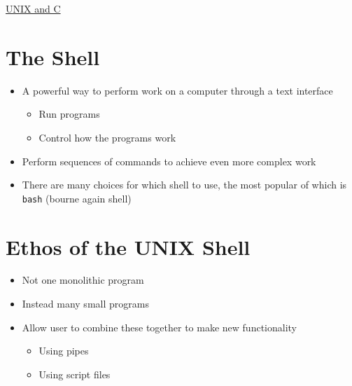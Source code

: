 \documentclass{article}
\begin{document}
	\begin{center}
		\underline{\huge UNIX and C}
	\end{center}

\section{The Shell}
\begin{itemize}
\item A powerful way to perform work on a computer through a text interface
\begin{itemize}
\item Run programs
\item Control how the programs work
\end{itemize}
\item Perform sequences of commands to achieve even more complex work
\item There are many choices for which shell to use, the most popular of which is \verb!bash! (bourne again shell)
\end{itemize}



\section{Ethos of the UNIX Shell}
\begin{itemize}
\item Not one monolithic program
\item Instead many small programs
\item Allow user to combine these together to make new functionality
\begin{itemize}
\item Using pipes
\item Using script files
\end{itemize}
\end{itemize}
\end{document}
